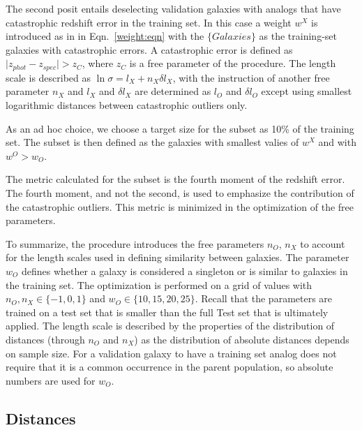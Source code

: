 \documentclass[preprint]{aastex}
\providecommand{\abs}[1]{\lvert#1\rvert}
\begin{document}
The second posit entails deselecting validation galaxies with analogs that have catastrophic redshift error
in the training set.  In this case a weight $w^X$ is introduced as in in Eqn.\ \ref{weight:eqn}  with the $\{Galaxies\}$
as the training-set galaxies with catastrophic errors.  A catastrophic error is
defined as $\abs{z_{phot}-z_{spec}}> z_C$, where $z_C$ is a free parameter of the procedure.
The length scale is described as $\ln{\sigma} = l_X +
n_X\delta l_X$, with the instruction of another free parameter $n_X$ and
$l_X$ and $\delta l_X$ are determined as  $l_O$ and $\delta l_O$
except using smallest logarithmic distances between catastrophic outliers only.

As an ad hoc choice, we choose a target size for the subset as 10\% of the training set.
The subset is then defined as the galaxies with smallest valies of $w^X$ and with  $w^O>w_O$.

The metric calculated for the subset is the fourth moment of the redshift error. The fourth moment, and not the
second, is used to emphasize the contribution of the catastrophic outliers.  This metric is minimized
in the optimization of the free parameters.

To summarize, the procedure introduces the free parameters $n_O$, $n_X$ to account for the length scales
used in defining similarity between galaxies.  
The parameter $w_O$ defines whether a galaxy is considered
a singleton or is similar to galaxies in the training set.
The optimization is performed on a grid of values with $n_O, n_X \in \{-1,0,1\}$ and $w_O \in \{10,15,20,25\}$.
Recall that the parameters are trained on a test set that is smaller than the full Test set that is ultimately applied.
The length scale is described by the properties of the distribution of distances (through  $n_O$ and $n_X$)
as the distribution of absolute distances depends on sample size.
For a validation galaxy to have a training set analog does not require that it is a common occurrence in the
parent population, so absolute numbers are used for $w_O$.

\subsection{Distances}
\end{document}
